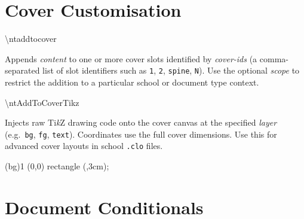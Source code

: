 \section{Cover Customisation}
\label{sec:int_covers}

\begin{macrodoc}{\textbackslash ntaddtocover}

Appends \emph{content} to one or more cover slots identified by
\emph{cover-ids} (a comma-separated list of slot identifiers such as
\texttt{1}, \texttt{2}, \texttt{spine}, \texttt{N}).
Use the optional \emph{scope} to restrict the addition to a
particular school or document type context.

\begin{latexcode}
\end{latexcode}
\end{macrodoc}

\bigskip

\begin{macrodoc}{\textbackslash ntAddToCoverTikz}

Injects raw Ti\textit{k}Z drawing code onto the cover canvas at the
specified \emph{layer} (e.g.\ \texttt{bg}, \texttt{fg},
\texttt{text}).  Coordinates use the full cover dimensions.
Use this for advanced cover layouts in school \texttt{.clo} files.

\begin{latexcode}
\ntAddToCoverTikz(bg){1}{%
  \fill[blue!20] (0,0) rectangle (\paperwidth,3cm);
}
\end{latexcode}
\end{macrodoc}

\section{Document Conditionals}
\label{sec:int_conditionals}

